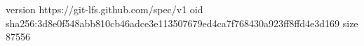 version https://git-lfs.github.com/spec/v1
oid sha256:3d8e0f548abb810cb46adce3e113507679ed4ca7f768430a923ff8ffd4e3d169
size 87556
